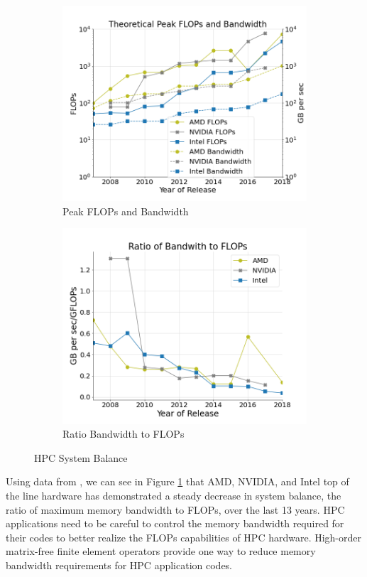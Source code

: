 \begin{figure}[ht!]
\begin{subfigure}{.49\textwidth}
\includegraphics[width=.99\linewidth]{../img/peakFlopsAndBandwidth}
\caption{Peak FLOPs and Bandwidth}
\end{subfigure}
\begin{subfigure}{.49\textwidth}
\includegraphics[width=.99\linewidth]{../img/peakRatio}
\caption{Ratio Bandwidth to FLOPs}
\end{subfigure}
\caption{HPC System Balance}
\label{fig:peakratio}
\end{figure}

Using data from \cite{kruppcomparison}, we can see in Figure \ref{fig:peakratio} that AMD, NVIDIA, and Intel top of the line hardware has demonstrated a steady decrease in system balance, the ratio of maximum memory bandwidth to FLOPs, over the last 13 years.
HPC applications need to be careful to control the memory bandwidth required for their codes to better realize the FLOPs capabilities of HPC hardware.
High-order matrix-free finite element operators provide one way to reduce memory bandwidth requirements for HPC application codes.
